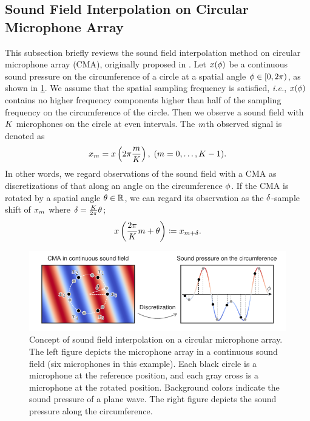 \documentclass[sip,biber]{now-journal}
\begin{document}
\subsection{Sound Field Interpolation on Circular Microphone Array}
This subsection briefly reviews the sound field interpolation method on circular microphone array (CMA), originally proposed in \cite{Wakabayashi:2021:ICASSP,Wakabayashi:2023:ASLP}.
Let $x (\phi)$ be a continuous sound pressure on the circumference of a circle at a spatial angle $\rotCoor \in \interval[open right,soft open fences]{0}{2\pi}$, as shown in \cref{fig:sfi}.
We assume that the spatial sampling frequency is satisfied, \emph{i.e.}, $x (\phi)$ contains no higher frequency components higher than half of the sampling frequency on the circumference of the circle.
Then we observe a sound field with $K$ microphones on the circle at even intervals.
The $m$th observed signal is denoted as
\begin{equation}
  \sfcma _{\mic} = \sfcma \left(2\pi \frac{\mic}{\Mic}\right),\; (\mic = 0, \dots, \Mic - 1).%
  \label{eq:sfi:model}
\end{equation}
In other words, we regard observations of the sound field with a CMA as discretizations of that along an angle on the circumference $\phi$.
If the CMA is rotated by a spatial angle $\theta \in \mathbb{R}$, we can regard its observation as the $\delta$-sample shift of $x _{m}$ where $\delta = \frac{K}{2\pi} \theta$;
\begin{equation}
  \sfcma \left(\frac{2\pi}{\Mic} \mic + \rotSpat \right)%
  \coloneqq
  \sfcma _{\mic + \rotSmpl}.
  \label{eq:sfi:shift:obs}
\end{equation}
\begin{figure}[t]
  \centering
  \includegraphics{figures/diagrams/sfi.pdf}
  \caption{%
    Concept of sound field interpolation on a circular microphone array.
    The left figure depicts the microphone array in a continuous sound field (six microphones in this example).
    Each black circle is a microphone at the reference position, and each gray cross is a microphone at the rotated position.
    Background colors indicate the sound pressure of a plane wave.
    The right figure depicts the sound pressure along the circumference.
  }%
  \label{fig:sfi}
\end{figure}
\end{document}

